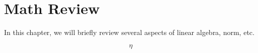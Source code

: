 \documentclass[main.tex]{subfiles}
\begin{document}
\chapter{Math Review}
In this chapter, we will briefly review several aspects of linear algebra, norm, etc.

\begin{equation}
\eta
\end{equation}
\end{document}
